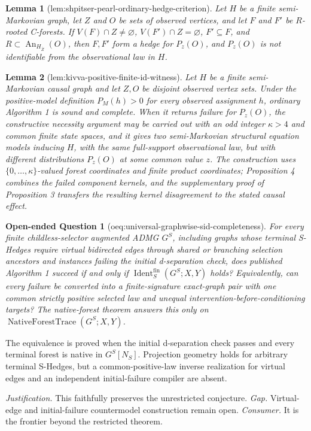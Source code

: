 \documentclass{article}
\newtheorem{lemma}{Lemma}
\newtheorem{openendedquestion}{Open-ended Question}
\begin{document}
\begin{lemma}[lem:shpitser-pearl-ordinary-hedge-criterion]\label{lem:shpitser-pearl-ordinary-hedge-criterion}
Let \(H\) be a finite semi-Markovian graph, let \(Z\) and \(O\) be sets of observed vertices, and let \(F\) and \(F'\) be \(R\)-rooted C-forests. If \(V(F)\cap Z\ne\varnothing\), \(V(F')\cap Z=\varnothing\), \(F'\subseteq F\), and \(R\subset\operatorname{An}_{H_{\overline Z}}(O)\), then \(F,F'\) form a hedge for \(P_z(O)\), and \(P_z(O)\) is not identifiable from the observational law in \(H\).
\end{lemma}

\begin{lemma}[lem:kivva-positive-finite-id-witness]\label{lem:kivva-positive-finite-id-witness}
Let \(H\) be a finite semi-Markovian causal graph and let \(Z,O\) be disjoint observed vertex sets. Under the positive-model definition \(P_M(h)>0\) for every observed assignment \(h\), ordinary Algorithm 1 is sound and complete. When it returns failure for \(P_z(O)\), the constructive necessity argument may be carried out with an odd integer \(\kappa>4\) and common finite state spaces, and it gives two semi-Markovian structural equation models inducing \(H\), with the same full-support observational law, but with different distributions \(P_z(O)\) at some common value \(z\). The construction uses \(\{0,\ldots,\kappa\}\)-valued forest coordinates and finite product coordinates; Proposition 4 combines the failed component kernels, and the supplementary proof of Proposition 3 transfers the resulting kernel disagreement to the stated causal effect.
\end{lemma}

\begin{openendedquestion}[oeq:universal-graphwise-sid-completeness]\label{oeq:universal-graphwise-sid-completeness}
For every finite childless-selector augmented ADMG \(G^S\), including graphs whose terminal S-Hedges require virtual bidirected edges through shared or branching selection ancestors and instances failing the initial d-separation check, does published Algorithm 1 succeed if and only if \(\operatorname{Ident}^{\mathrm{fin}}_S(G^S;X,Y)\) holds? Equivalently, can every failure be converted into a finite-signature exact-graph pair with one common strictly positive selected law and unequal intervention-before-conditioning targets? The native-forest theorem answers this only on \(\operatorname{NativeForestTrace}(G^S;X,Y)\).
\end{openendedquestion}
The equivalence is proved when the initial d-separation check passes and every terminal forest is native in \(G^S[N_S]\). Projection geometry holds for arbitrary terminal S-Hedges, but a common-positive-law inverse realization for virtual edges and an independent initial-failure compiler are absent.
\par\smallskip\noindent \textit{Justification.} This faithfully preserves the unrestricted conjecture. \textit{Gap.} Virtual-edge and initial-failure countermodel construction remain open. \textit{Consumer.} It is the frontier beyond the restricted theorem.
\end{document}
